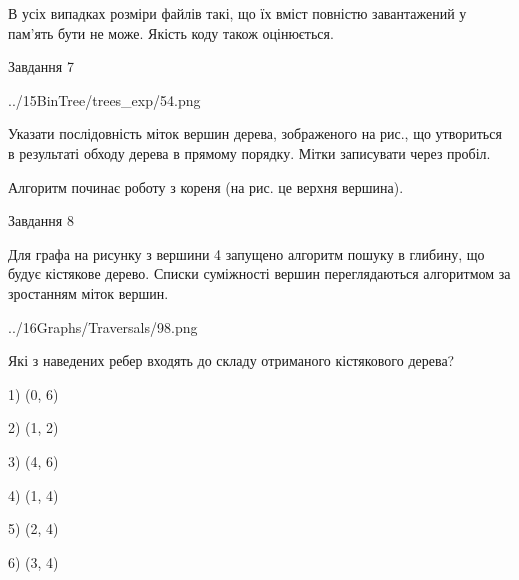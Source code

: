 \documentclass[12pt, ukrainian]{article}
\begin{document}
{В усіх випадках розміри файлів такі, що їх вміст повністю завантажений у пам'ять бути не може. Якість коду також оцінюється.



\vspace{10mm}\par

\newpage
\begin{minipage}[t]{9.7cm}
               
{\begin{center}Завдання {7}\end{center}}
\vspace{-4mm}

\begin{center}
	{../15BinTree/trees_exp/54.png}
\end{center}
Указати послідовність міток вершин дерева, зображеного на рис., що утвориться в результаті обходу дерева в прямому порядку. Мітки записувати через пробіл.\par Алгоритм починає роботу з кореня (на рис. це верхня вершина).\par

\end{minipage}
\vline \hspace{8mm}
\begin{minipage}[t]{8.0cm}
               
{\begin{center}Завдання {8}\end{center}}
\vspace{-4mm}
Для графа на рисунку з вершини 4 запущено алгоритм пошуку в глибину, що будує кістякове дерево. Списки суміжності вершин переглядаються алгоритмом за зростанням міток вершин.\par
\begin{center}
	{../16Graphs/Traversals/98.png}
\end{center}
\par Які з наведених ребер входять до складу отриманого кістякового дерева?\par
1) (0, 6)\par
2) (1, 2)\par
3) (4, 6)\par
4) (1, 4)\par
5) (2, 4)\par
6) (3, 4)\par
{\vskip 15pt} \par


\end{minipage}}
\end{document}
